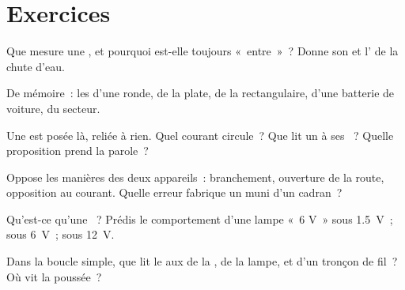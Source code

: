 \section{Exercices}

\begin{exercise}[$\star$]\label{exo:g8:voltage-voltmeter:1}
Que mesure une , et pourquoi est-elle toujours «~entre~»~?
Donne son  et l' de la chute d'eau.
\end{exercise}

\begin{exercise}[$\star$]\label{exo:g8:voltage-voltmeter:2}
De mémoire~: les  d'une  ronde, de la  plate, de la
 rectangulaire, d'une batterie de voiture, du secteur.
\end{exercise}

\begin{exercise}[$\star$]\label{exo:g8:voltage-voltmeter:3}
Une  est posée là, reliée à rien. Quel courant circule~? Que lit
un  à ses ~? Quelle proposition prend la parole~?
\end{exercise}

\begin{exercise}[$\star$]\label{exo:g8:voltage-voltmeter:4}
Oppose les manières des deux appareils~: branchement, ouverture de la
route, opposition au courant. Quelle erreur fabrique un
 muni d'un cadran~?
\end{exercise}

\begin{exercise}[$\star$]\label{exo:g8:voltage-voltmeter:5}
Qu'est-ce qu'une ~? Prédis le comportement d'une
lampe «~6 V~» sous \qty{1.5}{V}~; sous \qty{6}{V}~; sous
\qty{12}{V}.
\end{exercise}

\begin{exercise}[$\star$]\label{exo:g8:voltage-voltmeter:6}
Dans la boucle simple, que lit le  aux  de la , de
la lampe, et d'un tronçon de fil~? Où vit la poussée~?
\end{exercise}

